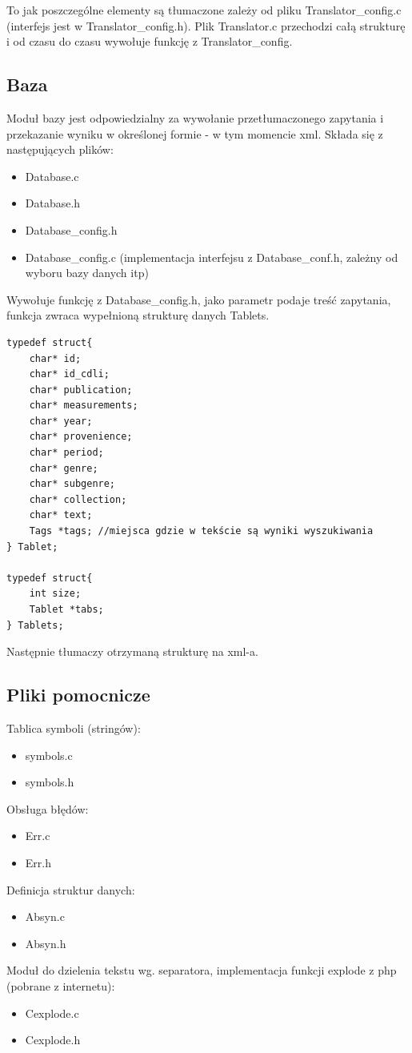 \documentclass{pracamgr}
\begin{document}
To jak poszczególne elementy są tłumaczone zależy od pliku Translator\_config.c (interfejs jest w Translator\_config.h). Plik Translator.c 
przechodzi całą strukturę i od czasu do czasu wywołuje funkcję z Translator\_config.

\subsection{Baza}
Moduł bazy jest odpowiedzialny za wywołanie przetłumaczonego zapytania i przekazanie wyniku w określonej formie - w tym momencie xml.
Składa się z następujących plików:
\begin {itemize}
 \item Database.c
 \item Database.h
 \item Database\_config.h
 \item Database\_config.c (implementacja interfejsu z Database\_conf.h, zależny od wyboru bazy danych itp)
\end {itemize}
Wywołuje funkcję z Database\_config.h, jako parametr podaje treść zapytania, funkcja zwraca wypełnioną strukturę danych Tablets.


\begin{verbatim}
typedef struct{    
    char* id;
    char* id_cdli;
    char* publication;
    char* measurements;
    char* year;
    char* provenience;
    char* period;
    char* genre;
    char* subgenre;
    char* collection;
    char* text;
    Tags *tags; //miejsca gdzie w tekście są wyniki wyszukiwania
} Tablet;

typedef struct{
    int size;
    Tablet *tabs;
} Tablets;
\end{verbatim}

Następnie tłumaczy otrzymaną strukturę na xml-a.

\subsection{Pliki pomocnicze}
Tablica symboli (stringów):
\begin{itemize}
 \item symbols.c
\item symbols.h
\end{itemize}
Obsługa błędów:
\begin{itemize}
 \item Err.c
\item Err.h
\end{itemize}
Definicja struktur danych:
\begin{itemize}
 \item Absyn.c
\item Absyn.h
\end{itemize}
Moduł do dzielenia tekstu wg. separatora, implementacja funkcji explode z php (pobrane z internetu):
\begin{itemize}
 \item Cexplode.c
 \item Cexplode.h
\end{itemize}
\end{document}
